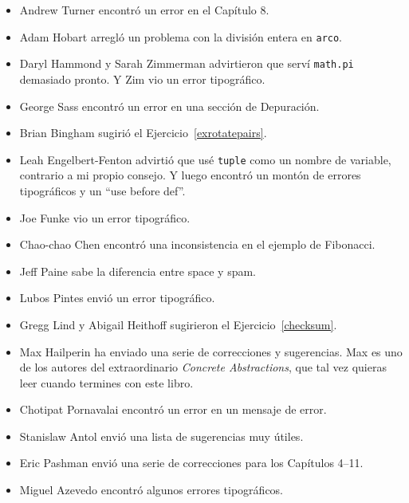 \documentclass[10pt]{book}
\begin{document}
\begin{itemize}
\item Andrew Turner encontró un error en el Capítulo 8.

\item Adam Hobart arregló un problema con la división entera en {\tt arco}.

\item Daryl Hammond y Sarah Zimmerman advirtieron que serví
{\tt math.pi} demasiado pronto.  Y Zim vio un error tipográfico.

\item George Sass encontró un error en una sección de Depuración.

\item Brian Bingham sugirió el Ejercicio~\ref{exrotatepairs}.

\item Leah Engelbert-Fenton advirtió que usé {\tt tuple}
como un nombre de variable, contrario a mi propio consejo.  Y luego encontró
un montón de errores tipográficos y un ``use before def''.

\item Joe Funke vio un error tipográfico.

\item Chao-chao Chen encontró una inconsistencia en el ejemplo de Fibonacci.

\item Jeff Paine sabe la diferencia entre space y spam.

\item Lubos Pintes envió un error tipográfico.

\item Gregg Lind y Abigail Heithoff sugirieron el Ejercicio~\ref{checksum}.

\item Max Hailperin ha enviado una serie de correcciones y
  sugerencias.  Max es uno de los autores del extraordinario {\em
    Concrete Abstractions}, que tal vez quieras leer cuando termines
  con este libro.

\item Chotipat Pornavalai encontró un error en un mensaje de error.

\item Stanislaw Antol envió una lista de sugerencias muy útiles.

\item Eric Pashman envió una serie de correcciones para los Capítulos 4--11.

\item Miguel Azevedo encontró algunos errores tipográficos.


\end{itemize}
\end{document}
